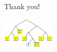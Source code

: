 \documentclass[xcolor=svgnames,12pt]{beamer}
\newenvironment{xframe}[1][]
  {\begin{frame}[fragile,environment=xframe,#1]}
  {\end{frame}}
\begin{document}
\begin{xframe}
  \begin{center}
    Thank you! \bigskip

    \includegraphics[width=1in]{deriv-tree}
  \end{center}
\end{xframe}


\end{document}
